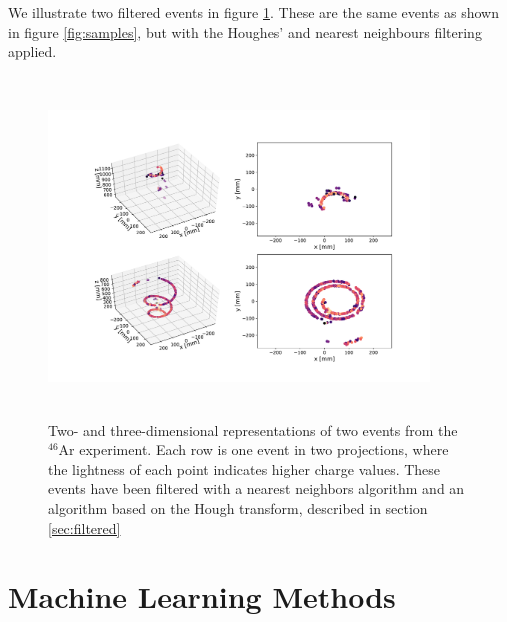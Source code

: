 \documentclass[preprint,12pt]{elsarticle}
\begin{document}
We illustrate two filtered events in figure \ref{fig:samples_filtered}. These are the same events as shown in figure \ref{fig:samples}, but with the Houghes' and nearest neighbours filtering applied. 

\begin{figure}[ht]
\centering
\includegraphics[width=0.9\textwidth, height=9cm]{plots/display_eventsclean_.pdf}
\caption[Displaying filtered events in 2D and 3D]{Two- and three-dimensional representations of two events from the ${}^{46}$Ar experiment. Each row is one event in two projections, where the lightness of each point indicates higher charge values. These events have been filtered with a nearest neighbors algorithm and an algorithm based on the Hough transform, described in section \ref{sec:filtered}}\label{fig:samples_filtered}
\end{figure}


\section{Machine Learning Methods}
\end{document}
